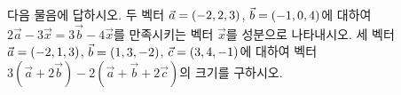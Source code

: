 다음 물음에 답하시오.
 두 벡터 $\vec{a}=(-2{,}\mkern3mu\mathopen{}2{,}\mkern3mu\mathopen{}3)$, $\vec{b}=(-1{,}\mkern3mu\mathopen{}0{,}\mkern3mu\mathopen{}4)$에 대하여 $2\vec{a}-3\vec{x}=3\vec{b}-4\vec{x}$를 만족시키는 벡터 $\vec{x}$를 성분으로 나타내시오.
 세 벡터 $\vec{a}=(-2{,}\mkern3mu\mathopen{}1{,}\mkern3mu\mathopen{}3)$, $\vec{b}=(1{,}\mkern3mu\mathopen{}3{,}\mkern3mu\mathopen{}-2)$, $\vec{c}=(3{,}\mkern3mu\mathopen{}4{,}\mkern3mu\mathopen{}-1)$에 대하여 벡터 $3(\vec{a}+2\vec{b})-2(\vec{a}+\vec{b}+2\vec{c})$의 크기를 구하시오.
